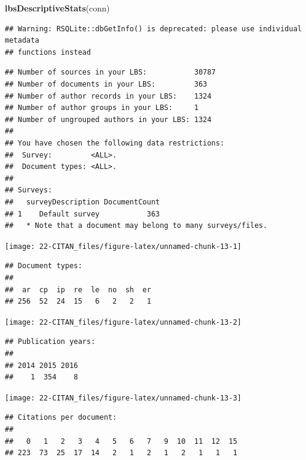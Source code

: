 \documentclass[]{book}
\newenvironment{Shaded}{\begin{snugshade}}{\end{snugshade}}
\newcommand{\KeywordTok}[1]{\textcolor[rgb]{0.13,0.29,0.53}{\textbf{#1}}}
\newcommand{\NormalTok}[1]{#1}
\begin{document}
\begin{Shaded}
\begin{Highlighting}[]
\KeywordTok{lbsDescriptiveStats}\NormalTok{(conn)}
\end{Highlighting}
\end{Shaded}

\begin{verbatim}
## Warning: RSQLite::dbGetInfo() is deprecated: please use individual metadata
## functions instead
\end{verbatim}

\begin{verbatim}
## Number of sources in your LBS:           30787
## Number of documents in your LBS:         363
## Number of author records in your LBS:    1324
## Number of author groups in your LBS:     1
## Number of ungrouped authors in your LBS: 1324
## 
## You have chosen the following data restrictions:
##  Survey:         <ALL>.
##  Document types: <ALL>.
## 
## Surveys:
##   surveyDescription DocumentCount
## 1    Default survey           363
##   * Note that a document may belong to many surveys/files.
\end{verbatim}

\begin{center}\texttt{[image: 22-CITAN\_files/figure-latex/unnamed-chunk-13-1]} \end{center}

\begin{verbatim}
## Document types:
## 
##  ar  cp  ip  re  le  no  sh  er 
## 256  52  24  15   6   2   2   1
\end{verbatim}

\begin{center}\texttt{[image: 22-CITAN\_files/figure-latex/unnamed-chunk-13-2]} \end{center}

\begin{verbatim}
## Publication years:
## 
## 2014 2015 2016 
##    1  354    8
\end{verbatim}

\begin{center}\texttt{[image: 22-CITAN\_files/figure-latex/unnamed-chunk-13-3]} \end{center}

\begin{verbatim}
## Citations per document:
## 
##   0   1   2   3   4   5   6   7   9  10  11  12  15 
## 223  73  25  17  14   2   1   2   1   2   1   1   1
\end{verbatim}
\end{document}

